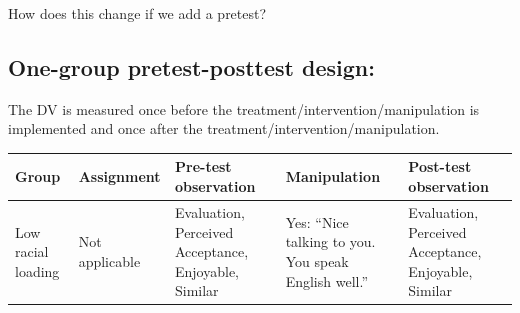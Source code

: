 \documentclass[
  english,
]{book}
\begin{document}
How does this change if we add a pretest?

\hypertarget{one-group-pretest-posttest-design}{%
\subsection{One-group pretest-posttest design:}\label{one-group-pretest-posttest-design}}

The DV is measured once before the treatment/intervention/manipulation is implemented and once after the treatment/intervention/manipulation.

\begin{longtable}[]{@{}lllll@{}}
\toprule
\begin{minipage}[b]{0.10\columnwidth}\raggedright
Group\strut
\end{minipage} & \begin{minipage}[b]{0.17\columnwidth}\raggedright
Assignment\strut
\end{minipage} & \begin{minipage}[b]{0.22\columnwidth}\raggedright
Pre-test observation\strut
\end{minipage} & \begin{minipage}[b]{0.15\columnwidth}\raggedright
Manipulation\strut
\end{minipage} & \begin{minipage}[b]{0.22\columnwidth}\raggedright
Post-test observation\strut
\end{minipage}\tabularnewline
\midrule
\endhead
\begin{minipage}[t]{0.10\columnwidth}\raggedright
Low racial loading\strut
\end{minipage} & \begin{minipage}[t]{0.17\columnwidth}\raggedright
Not applicable\strut
\end{minipage} & \begin{minipage}[t]{0.22\columnwidth}\raggedright
Evaluation, Perceived Acceptance, Enjoyable, Similar\strut
\end{minipage} & \begin{minipage}[t]{0.15\columnwidth}\raggedright
Yes: ``Nice talking to you. You speak English well.''\strut
\end{minipage} & \begin{minipage}[t]{0.22\columnwidth}\raggedright
Evaluation, Perceived Acceptance, Enjoyable, Similar\strut
\end{minipage}\tabularnewline
\bottomrule
\end{longtable}
\end{document}
